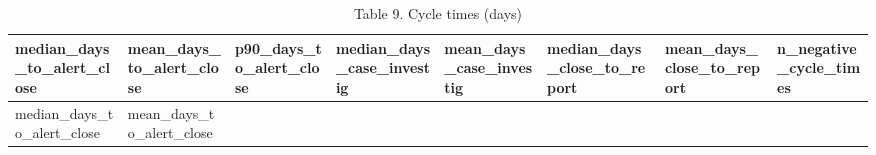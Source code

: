 \documentclass[
]{article}
\begin{document}
\begin{longtable}[]{@{}
  >{\raggedleft\arraybackslash}p{}
  >{\raggedleft\arraybackslash}p{}
  >{\raggedleft\arraybackslash}p{}
  >{\raggedleft\arraybackslash}p{}
  >{\raggedleft\arraybackslash}p{}
  >{\raggedright\arraybackslash}p{}
  >{\raggedright\arraybackslash}p{}
  >{\raggedleft\arraybackslash}p{}@{}}
\caption{Table 9. Cycle times (days)}\tabularnewline
\toprule\noalign{}
\begin{minipage}[b]{\linewidth}\raggedleft
median\_days\_to\_alert\_close
\end{minipage} & \begin{minipage}[b]{\linewidth}\raggedleft
mean\_days\_to\_alert\_close
\end{minipage} & \begin{minipage}[b]{\linewidth}\raggedleft
p90\_days\_to\_alert\_close
\end{minipage} & \begin{minipage}[b]{\linewidth}\raggedleft
median\_days\_case\_investig
\end{minipage} & \begin{minipage}[b]{\linewidth}\raggedleft
mean\_days\_case\_investig
\end{minipage} & \begin{minipage}[b]{\linewidth}\raggedright
median\_days\_close\_to\_report
\end{minipage} & \begin{minipage}[b]{\linewidth}\raggedright
mean\_days\_close\_to\_report
\end{minipage} & \begin{minipage}[b]{\linewidth}\raggedleft
n\_negative\_cycle\_times
\end{minipage} \\
\midrule\noalign{}
\endfirsthead
\toprule\noalign{}
\begin{minipage}[b]{\linewidth}\raggedleft
median\_days\_to\_alert\_close
\end{minipage} & \begin{minipage}[b]{\linewidth}\raggedleft
mean\_days\_to\_alert\_close
\end{minipage} & \begin{minipage}[b]{\linewidth}\raggedleft

\end{minipage}
\end{longtable}
\end{document}
